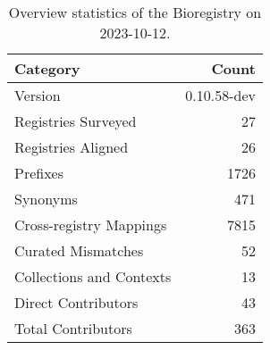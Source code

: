 \begin{table}
\caption{Overview statistics of the Bioregistry on 2023-10-12.}
\label{tab:bioregistry-summary}
\begin{tabular}{lr}
\toprule
Category & Count \\
\midrule
Version & 0.10.58-dev \\
Registries Surveyed & 27 \\
Registries Aligned & 26 \\
Prefixes & 1726 \\
Synonyms & 471 \\
Cross-registry Mappings & 7815 \\
Curated Mismatches & 52 \\
Collections and Contexts & 13 \\
Direct Contributors & 43 \\
Total Contributors & 363 \\
\bottomrule
\end{tabular}
\end{table}
